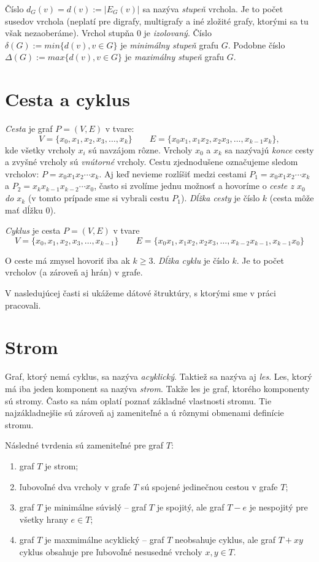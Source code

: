 Číslo $d_G(v) = d(v) := |E_G(v)|$ sa nazýva \emph{stupeň} vrchola. Je to počet 
susedov vrchola (neplatí pre digrafy, multigrafy a iné zložité grafy, ktorými 
sa tu však nezaoberáme). Vrchol stupňa $0$ je \emph{izolovaný}. Číslo $\delta 
(G) := min \{d(v), v \in G\}$ je \emph{minimálny stupeň} grafu $G$. Podobne 
číslo $\Delta (G) := max \{d(v), v \in G\}$ je \emph{maximálny stupeň} grafu 
$G$.

\section{Cesta a cyklus}

\emph{Cesta} je graf $P = (V, E)$ v tvare: 
$$ V = \{x_0, x_1, x_2, x_3, \ldots, x_k\} \qquad 
   E = \{x_0x_1, x_1x_2, x_2x_3, \ldots, x_{k-1}x_k\},$$
kde všetky vrcholy $x_i$ sú navzájom rôzne. Vrcholy $x_0$ a $x_k$ sa nazývajú 
\emph{konce} cesty a zvyšné vrcholy sú \emph{vnútorné} vrcholy. Cestu 
zjednodušene označujeme sledom vrcholov: $P = x_0x_1x_2\cdots x_k$. Aj keď 
nevieme rozlíšiť medzi cestami $P_1 = x_0x_1x_2\cdots x_k$ a 
$P_2 = x_kx_{k-1}x_{k-2}\cdots x_0$, často si zvolíme jednu možnosť a hovoríme 
o \emph{ceste z $x_0$ do $x_k$} (v tomto prípade sme si vybrali cestu $P_1$). 
\emph{Dĺžka cesty} je číslo $k$ (cesta môže mať dĺžku 0).

\emph{Cyklus} je cesta $P = (V, E)$ v tvare 
$$ V = \{ x_0, x_1, x_2, x_3, \ldots, x_{k-1}\} \qquad 
E = \{x_0x_1, x_1x_2, x_2x_3, \ldots, x_{k-2}x_{k-1}, x_{k-1}x_0\}$$

O ceste má zmysel hovoriť iba ak $k \geq 3$. \emph{Dĺžka cyklu} je číslo $k$. 
Je to počet vrcholov (a zároveň aj hrán) v grafe.

V nasledujúcej časti si ukážeme dátové štruktúry, s ktorými sme v práci 
pracovali.

\section{Strom}

Graf, ktorý nemá cyklus, sa nazýva \emph{acyklický}. Taktiež sa nazýva aj 
\emph{les}. Les, ktorý má iba jeden komponent sa nazýva \emph{strom}. Takže 
les je graf, ktorého komponenty sú stromy. Často sa nám oplatí poznať 
základné vlastnosti stromu. 
Tie najzákladnejšie sú zároveň aj zameniteľné a ú rôznymi obmenami definície 
stromu.

Následné tvrdenia sú zameniteľné pre graf $T$:
\begin{enumerate}
	\item \label{itm:strom} graf $T$ je strom;
	\item ľubovoľné dva vrcholy v grafe $T$ sú spojené jedinečnou cestou 
v grafe $T$;
	\item \label{itm:minsuv} graf $T$ je minimálne súvislý -- graf $T$ 
je spojitý, ale graf $T - e$ je nespojitý pre všetky hrany $e \in T$;
	\item graf $T$ je maxmimálne acyklický -- graf $T$ neobsahuje cyklus, 
ale graf $T + xy$ cyklus obsahuje pre ľubovoľné nesusedné vrcholy $x, y \in T$.
\end{enumerate}

